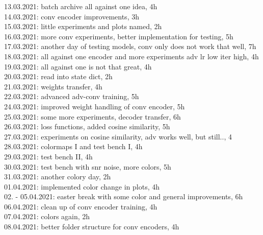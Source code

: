 13.03.2021: batch archive all against one idea, 4h\\ 
14.03.2021: conv encoder improvements, 3h\\

15.03.2021: little experiments and plots named, 2h\\
16.03.2021: more conv experiments, better implementation for testing, 5h\\
17.03.2021: another day of testing models, conv only does not work that well, 7h\\

18.03.2021: all against one encoder and more experiments adv lr low iter high, 4h\\
19.03.2021: all against one is not that great, 4h\\

20.03.2021: read into state dict, 2h\\
21.03.2021: weights transfer, 4h\\

22.03.2021: advanced adv-conv training, 5h\\
24.03.2021: improved weight handling of conv encoder, 5h\\

25.03.2021: some more experiments, decoder transfer, 6h\\
26.03.2021: loss functions, added cosine similarity, 5h\\

27.03.2021: experiments on cosine similarity, adv works well, but still.., 4\\
28.03.2021: colormaps I and test bench I, 4h\\
29.03.2021: test bench II, 4h\\

30.03.2021: test bench with snr noise, more colors, 5h\\
31.03.2021: another colory day, 2h\\

01.04.2021: implemented color change in plots, 4h\\
02. - 05.04.2021: easter break with some color and general improvements, 6h\\

06.04.2021: clean up of conv encoder training, 4h\\
07.04.2021: colors again, 2h\\
08.04.2021: better folder structure for conv encoders, 4h\\

